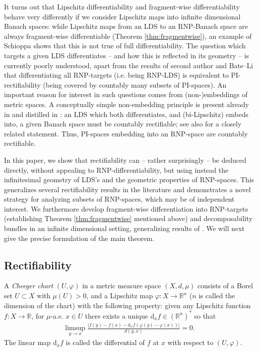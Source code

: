 \documentclass{amsart}
\numberwithin{equation}{section}
\newcommand{\R}{\mathbb{R}}
\newcommand{\ud}{\mathrm {d}}
\begin{document}
It turns out that Lipschitz differentiability and fragment-wise differentiability behave very differently if we consider Lipschitz maps into infinite dimensional Banach spaces: while Lipschitz maps from an LDS to an RNP-Banach space are always fragment-wise differentiable (Theorem \ref{thm:fragmentwise}), an example of Schioppa \cite{schioppadiff,waldbate} shows that this is not true of full differentiability. The question which targets a given LDS differentiates -- and how this is reflected in its geometry -- is currently poorly understood, apart from the results of second author and Bate--Li \cite{bateli,sebgafa} that differentiating all RNP-targets (i.e. being RNP-LDS) is equivalent to PI-rectifiability (being covered by countably many subsets of PI-spaces). An important reason for interest in such questions comes from (non-)embeddings of metric spaces. A conceptually simple non-embedding principle is present already in \cite[Theorem 14.2]{che99} and distilled in \cite[Theorem 1.2 and Corollary 1.3]{terirect}: an LDS which both differentiates, and (bi-Lipschitz) embeds into, a given Banach space must be countably rectifiable; see also \cite[Corollary 3.2]{lytopen} for a closely related statement. Thus, PI-spaces embedding into an RNP-space are countably rectifiable. 

In this paper, we show that rectifiability can -- rather surprisingly -- be deduced directly, without appealing to RNP-differentiability, but using instead the infinitesimal geometry of LDS's and the geometric properties of RNP-spaces. This generalizes several rectifiability results in the literature and demonstrates a novel strategy for analyzing subsets of RNP-spaces, which may be of independent interest. We furthermore develop fragment-wise differentiation into RNP-targets (establishing Theorem \ref{thm:fragmentwise} mentioned above) and decomposability bundles in an infinite dimensional setting, generalizing results of \cite{almar16}. We will next give the precise formulation of the main theorem.


\subsection{Rectifiability}
A \emph{Cheeger chart} $(U,\varphi)$ in a metric measure space $(X,d,\mu)$ consists of a Borel set $U\subset X$ with $\mu(U)>0$, and a Lipschitz map $\varphi:X\to \R^n$ ($n$ is called the dimension of the chart) with the following property: given any Lipschitz function $f:X\to \R$, for $\mu$-a.e. $x\in U$ there exists a unique $\ud_xf\in(\R^n)^*$ so that 
\begin{align}\label{eq:LDS-diff}
	\limsup_{y\to x}\frac{|f(y)-f(x)-\ud_xf(\varphi(y)-\varphi(x))|}{d(y,x)}=0.
\end{align}
The linear map $\ud_xf$ is called the differential of $f$ at $x$ with respect to $(U,\varphi)$. 
\end{document}
